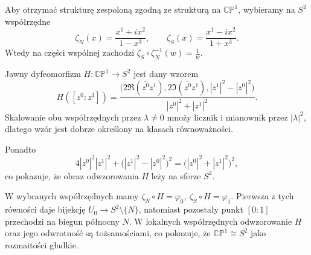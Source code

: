 \begin{przyklad}
Aby otrzymać strukturę zespoloną zgodną ze strukturą na
$\mathbb{CP}^1$, wybieramy na $S^2$ współrzędne
\[
\zeta_N(x)
=
\frac{x^1+ix^2}{1-x^3},
\qquad
\zeta_S(x)
=
\frac{x^1-ix^2}{1+x^3}.
\]
Wtedy na części wspólnej zachodzi $\zeta_S\circ\zeta_N^{-1}(w) = \frac1w$.

Jawny dyfeomorfizm $H:\mathbb{CP}^1\longrightarrow S^2$
jest dany wzorem
\[
H([z^0:z^1])
=
\frac{
\big(
2\Re(\overline{z^0}z^1),
2\Im(\overline{z^0}z^1),
|z^1|^2-|z^0|^2
\big)
}{
|z^0|^2+|z^1|^2
}.
\]
Skalowanie obu współrzędnych przez $\lambda\neq0$ mnoży licznik
i mianownik przez $|\lambda|^2$, dlatego wzór jest dobrze określony
na klasach równoważności.

Ponadto
\[
4|z^0|^2|z^1|^2
+
\big(|z^1|^2-|z^0|^2\big)^2
=
\big(|z^0|^2+|z^1|^2\big)^2,
\]
co pokazuje, że obraz odwzorowania $H$ leży na sferze $S^2$.

W wybranych współrzędnych mamy $\zeta_N\circ H=\varphi_0, \ \zeta_S\circ H=\varphi_1$.
Pierwsza z tych równości daje bijekcję $U_0\longrightarrow S^2\setminus\{N\}$,
natomiast pozostały punkt $[0:1]$
przechodzi na biegun północny $N$.
W lokalnych współrzędnych odwzorowanie $H$ oraz jego odwrotność są
tożsamościami, co pokazuje, że $\mathbb{CP}^1\cong S^2$
jako rozmaitości gładkie.
\end{przyklad}



